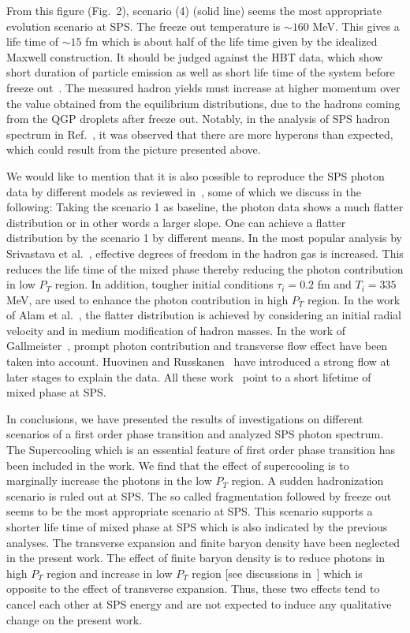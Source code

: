   From this figure (Fig.~2), scenario (4) (solid line) seems the 
most appropriate evolution scenario at SPS. 
The freeze out temperature is $\sim 160$ MeV. 
This gives a life time of $\sim 15$ fm which is about half of the
life time given by the idealized Maxwell construction. It should be 
judged against the HBT data, which show short duration of particle 
emission as well as short life time of the system before freeze 
out~\cite{HBT}. The measured hadron yields
must increase at higher momentum over the value obtained from the 
equilibrium distributions, due to the hadrons coming from the 
QGP droplets after freeze out. Notably, in the analysis of SPS hadron 
spectrum in Ref.~\cite{XU}, it was observed that there are more hyperons 
than expected, which could result from the picture presented above.

  We would like to mention that it is also possible to reproduce the SPS
photon data by different models as reviewed in~\cite{PEITTHOMA,GALER},
some of which we discuss in the following:
 Taking the scenario 1 as baseline, the photon data shows a much flatter
distribution or in other words a larger slope. One can achieve a flatter
distribution by the scenario 1 by different means.
 In the most popular analysis by 
Srivastava et al.~\cite{SRIVASTAVA}, effective degrees of freedom in 
the hadron gas is increased. This reduces the life time of the 
mixed phase thereby reducing the photon contribution in low $P_T$ region.
In addition, tougher initial conditions $\tau_i = 0.2$ fm and 
$T_i = 335$ MeV, are used to enhance the
photon contribution in high $P_T$ region. In the work of 
Alam et al.~\cite{ALAM}, the flatter distribution is achieved by 
considering an initial radial 
velocity and in medium modification of hadron masses. In the work of 
Gallmeister~\cite{GALLMEISTER}, prompt photon contribution and
transverse flow effect have been taken into account. 
Huovinen and Russkanen~\cite{HUOV} have introduced a strong flow at later 
stages to explain the data. All these 
work~\cite{SRIVASTAVA,ALAM,GALLMEISTER,HUOV} point to a short lifetime
of mixed phase at SPS. 
 
  In conclusions, we have presented the results of investigations on 
different scenarios of a first order phase transition and analyzed
SPS photon spectrum. The Supercooling which is an essential 
feature of first order phase transition has been included in the work.
We find that the effect of supercooling is to marginally increase the 
photons in the low $P_T$ region. A sudden hadronization scenario is ruled 
out at SPS. The so called fragmentation followed by freeze out seems 
to be the most appropriate scenario at SPS. This scenario supports a 
shorter life time of mixed phase at SPS which is also indicated by the 
previous analyses.
  The transverse expansion and finite baryon density have been neglected
in the present work. The effect of finite baryon density is to reduce
photons in high $P_T$ region and increase in low $P_T$ 
region [see discussions in~\cite{PEITTHOMA}] which is opposite to the
effect of transverse expansion. 
 Thus, these two effects tend to cancel each other at SPS energy and 
are not expected 
to induce any qualitative change on the present work. 

